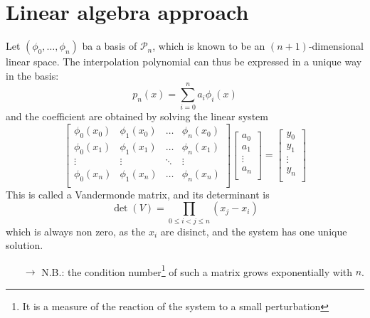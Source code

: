 \documentclass[12pt, openany]{report}
\theoremstyle{definition}
\begin{document}
\section{Linear algebra approach}
Let \((\phi_0,\dots,\phi_n)\) ba a basis of \(\mathcal{P}_n\), which is known to be an \((n+1)\)-dimensional linear space. The interpolation polynomial can thus be expressed in a unique way in the basis:
\begin{equation}
    p_n(x) = \sum_{i=0}^n a_i\phi_i(x)
\end{equation}
and the coefficient are obtained by solving the linear system
\begin{equation}
    \begin{bmatrix}
        \phi_0(x_0) & \phi_1(x_0) & \dots & \phi_n(x_0)\\
        \phi_0(x_1) & \phi_1(x_1) & \dots & \phi_n(x_1)\\
        \vdots  & \vdots & \ddots & \vdots\\
        \phi_0(x_n) & \phi_1(x_n) & \dots & \phi_n(x_n)\\
    \end{bmatrix}\begin{bmatrix}
        a_0\\ a_1\\ \vdots \\a_n\\
    \end{bmatrix} = \begin{bmatrix}
        y_0 \\y_1\\\vdots \\ y_n\\
    \end{bmatrix}
\end{equation}
This is called a Vandermonde matrix, and its determinant is 
\begin{equation}
    \det(V) = \prod_{0\le i< j\le n}(x_j-x_i)
\end{equation}
which is always non zero, as the \(x_i\) are disinct, and the system has one unique solution. 
\begin{itemize}
    \item [\(\rightarrow\)] N.B.: the condition number\footnote{It is a measure of the reaction of the system to a small perturbation} of such a matrix grows exponentially with \(n\). 
\end{itemize}
\end{document}
